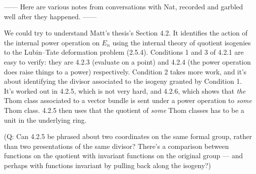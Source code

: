 





------ Here are various notes from conversations with Nat, recorded and garbled well after they happened. ------

We could try to understand Matt's thesis's Section 4.2.  It identifies the action of the internal power operation on $E_n$ using the internal theory of quotient isogenies to the Lubin--Tate deformation problem (2.5.4).  Conditions 1 and 3 of 4.2.1 are easy to verify: they are 4.2.3 (evaluate on a point) and 4.2.4 (the power operation does raise things to a power) respectively.  Condition 2 takes more work, and it's about identifying the divisor associated to the isogeny granted by Condition 1.  It's worked out in 4.2.5, which is not very hard, and 4.2.6, which shows that \emph{the} Thom class associated to a vector bundle is sent under a power operation to \emph{some} Thom class.  4.2.5 then uses that the quotient of \emph{some} Thom classes has to be a unit in the underlying ring.

(Q: Can 4.2.5 be phrased about two coordinates on the same formal group, rather than two presentations of the same divisor?  There's a comparison between functions on the quotient with invariant functions on the original group --- and perhaps with functions invariant by pulling back along the isogeny?)

